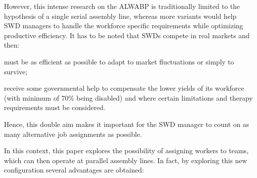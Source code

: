 \documentclass{singlecol-new}
\begin{document}
However, this intense research on the ALWABP is traditionally limited to the hypothesis of a single serial assembly line, whereas more variants would help SWD managers to handle the workforce specific requirements while optimizing productive efficiency. It has to be noted that SWDs compete in real markets and then:
\begin{enumerate*}[label=\itshape\alph*\upshape)]
	\item must be as efficient as possible to adapt to market fluctuations or simply to survive;
	\item receive some governmental help to compensate the lower yields of its workforce (with minimum of 70\% being disabled) and where certain limitations and therapy requirements must be considered.
\end{enumerate*}
Hence, this double aim makes it important for the SWD manager to count on as many alternative job assignments as possible.

In this context, this paper explores the possibility of assigning workers to teams, which can then operate at parallel assembly lines. In fact, by exploring this new configuration several advantages are obtained:
\end{document}

